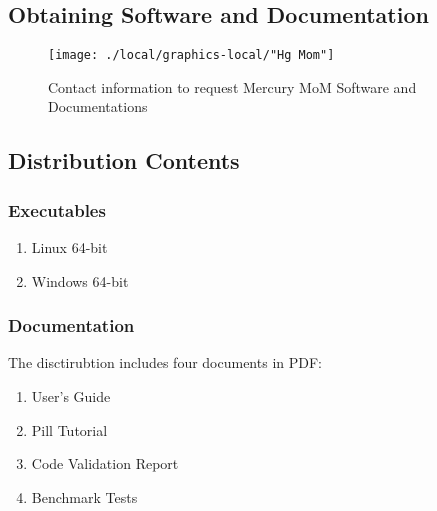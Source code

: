 \subsection{Obtaining Software and Documentation}
\begin{figure}[htbp]
\begin{center}
	\texttt{[image: ./local/graphics-local/"Hg Mom"]}
\caption{Contact information to request Mercury MoM Software and Documentations}
\label{fig:kam-miller}
\end{center}
\end{figure}

\subsection{Distribution Contents}
\subsubsection{Executables}
\begin{enumerate}
	\item Linux 64-bit
	\item Windows 64-bit
\end{enumerate}

\subsubsection{Documentation}
The disctirubtion includes four documents in PDF:
\begin{enumerate}
	\item User's Guide
	\item Pill Tutorial
	\item Code Validation Report
	\item Benchmark Tests
\end{enumerate}

\endinput  %
